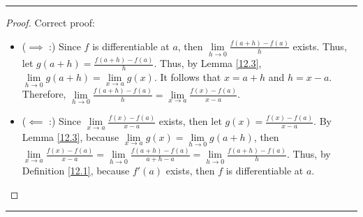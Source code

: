 \documentclass[openany, amssymb, psamsfonts]{amsart}
\theoremstyle{definition}
\numberwithin{equation}{section}
\begin{document}
 \vspace{4pt}     \hrule   \vspace{4pt} \begin{proof} Correct proof:
 \begin{itemize}
     \item ($\implies$ :) Since $f$ is differentiable at $a$, then $
     \lim\limits_{h\to 0}\frac{f(a+h) - f(a)}{h}$ exists. Thus, let $g(a+h) = \frac{f(a+h) - f(a)}{h}$. Thus, by Lemma \ref{12.3}, $\lim\limits_{h\to 0} g(a+h) = \lim\limits_{x\to a}g(x)$.  It follows that $x = a+h$ and $h = x-a$. Therefore, $\lim\limits_{h\to 0} \frac{f(a+h) - f(a)}{h} = \lim\limits_{x\to a}\frac{f(x) - f(a)}{x-a}$. 
     \item ($\impliedby$ :) Since $\lim\limits_{x\to a} \frac{f(x)-f(a)}{x-a}$ exists, then let $g(x) = \frac{f(x) - f(a)}{x-a}$. By Lemma \ref{12.3}, because $\lim\limits_{x\to a}g(x) = \lim\limits_{h\to 0}g(a+h)$, then $\lim\limits_{x\to a}\frac{f(x) - f(a)}{x-a} = \lim\limits_{h\to 0}\frac{f(a+h) - f(a)}{a+h-a} = \lim\limits_{h\to 0} \frac{f(a+h) - f(a)}{h}$. Thus, by Definition \ref{12.1}, because $f'(a)$ exists, then $f$ is differentiable at $a$. 
 \end{itemize}
\end{proof} \vspace{4pt}     \hrule   \vspace{4pt}
\end{document}
